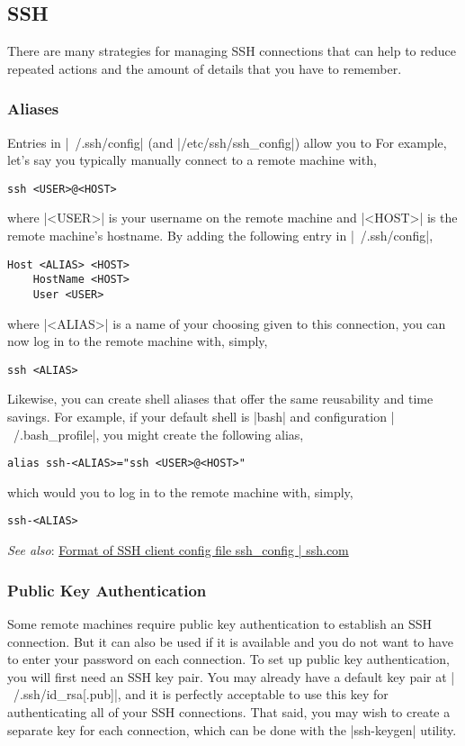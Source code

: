 
\subsection{SSH} \label{sec:supplements-ssh}
There are many strategies for managing SSH connections that can help to reduce repeated actions and the amount of details that you have to remember.

\subsubsection{Aliases}
Entries in \lstinlinebg|~/.ssh/config| (and \lstinlinebg|/etc/ssh/ssh_config|) allow you to For example, let's say you typically manually connect to a remote machine with,
\begin{lstlisting}
ssh <USER>@<HOST>
\end{lstlisting}
where \lstinlinebg|<USER>| is your username on the remote machine and \lstinlinebg|<HOST>| is the remote machine's hostname. By adding the following entry in \lstinlinebg|~/.ssh/config|,
\begin{lstlisting}
Host <ALIAS> <HOST>
	HostName <HOST>
	User <USER>
\end{lstlisting}
where \lstinlinebg|<ALIAS>| is a name of your choosing given to this connection, you can now log in to the remote machine with, simply,
\begin{lstlisting}
ssh <ALIAS>
\end{lstlisting}

Likewise, you can create shell aliases that offer the same reusability and time savings. For example, if your default shell is \lstinlinebg|bash| and configuration \lstinlinebg|~/.bash_profile|, you might create the following alias,
\begin{lstlisting}
alias ssh-<ALIAS>="ssh <USER>@<HOST>"
\end{lstlisting}
which would you to log in to the remote machine with, simply,
\begin{lstlisting}
ssh-<ALIAS>
\end{lstlisting}

\emph{See also}: \href{https://www.ssh.com/academy/ssh/config\#format-of-ssh-client-config-file-ssh_config}{Format of SSH client config file ssh\_config | ssh.com}

\subsubsection{Public Key Authentication}
Some remote machines require public key authentication to establish an SSH connection. But it can also be used if it is available and you do not want to have to enter your password on each connection. To set up public key authentication, you will first need an SSH key pair. You may already have a default key pair at \lstinlinebg|~/.ssh/id_rsa[.pub]|, and it is perfectly acceptable to use this key for authenticating all of your SSH connections. That said, you may wish to create a separate key for each connection, which can be done with the \lstinlinebg|ssh-keygen| utility.

